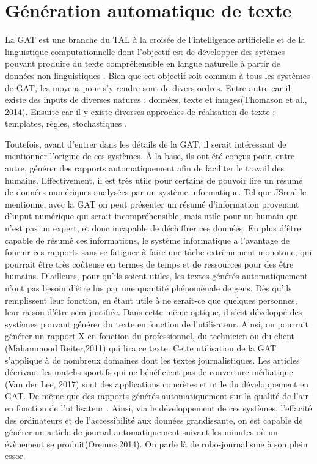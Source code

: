 
\chapter{Génération automatique de texte}

La \acf{GAT} est une branche du \acf{TAL} à la croisée de l'intelligence artificielle et de la linguistique computationnelle dont l'objectif est de développer des sytèmes pouvant produire du texte compréhensible en langue naturelle à partir de données non-linguistiques \citep{ReiterBuildingNaturalLanguage2000}. Bien que cet objectif soit commun à tous les systèmes de \ac{GAT}, les moyens pour s'y rendre sont de divers ordres. Entre autre car il existe des inputs de diverses natures : données, texte et images(Thomason et al., 2014). Ensuite car il y existe diverses approches de réalisation de texte : templates, règles, stochastiques \citep{gatt18}.

Toutefois, avant d'entrer dans les détails de la \ac{GAT}, il serait intéressant de mentionner l'origine de ces systèmes. À la base, ils ont été conçus pour, entre autre, générer des rapports automatiquement afin de faciliter le travail des humains. Effectivement, il est très utile pour certains de pouvoir lire un résumé de données numériques analysées par un système informatique. Tel que JSreal le mentionne, avec la GAT on peut présenter un résumé d'information provenant d'input numérique qui serait incompréhensible, mais utile pour un humain qui n'est pas un expert, et donc incapable de déchiffrer ces données. En plus d'être capable de résumé ces informations, le système informatique a l'avantage de fournir ces rapports sans se fatiguer à faire une tâche extrêmement monotone, qui pourrait être très coûteuse en termes de temps et de ressources pour des être humains.  D'ailleurs, pour qu'ils soient utiles, les textes générés automatiquement n'ont pas besoin d'être lus par une quantité phénomènale de gens. Dès qu'ils remplissent leur fonction, en étant utile à ne serait-ce que quelques personnes, leur raison d'être sera justifiée.  Dans cette même optique, il s'est développé des systèmes pouvant générer du texte en fonction de l'utilisateur. Ainsi, on pourrait générer un rapport X en fonction du professionnel, du technicien ou du client (Mahammood Reiter,2011) qui lira ce texte. Cette utilisation de la \ac{GAT} s'applique à de nombreux domaines dont les textes journalistiques. Les articles décrivant les matchs sportifs qui ne bénéficient pas de couverture médiatique (Van der Lee, 2017) sont des applications concrètes et utile du développement en \ac{GAT}. De même que des rapports générés automatiquement sur la qualité de l'air en fonction de l'utilisateur \citep{WannerMARQUISGENERATIONUSERTAILORED2010}. Ainsi, via le développement de ces systèmes, l'effacité des ordinateurs et de l'accessibilité aux données grandissante, on est capable de générer un article de journal automatiquement suivant les minutes où un évènement se produit(Oremus,2014). On parle là de robo-journalisme à son plein essor.

